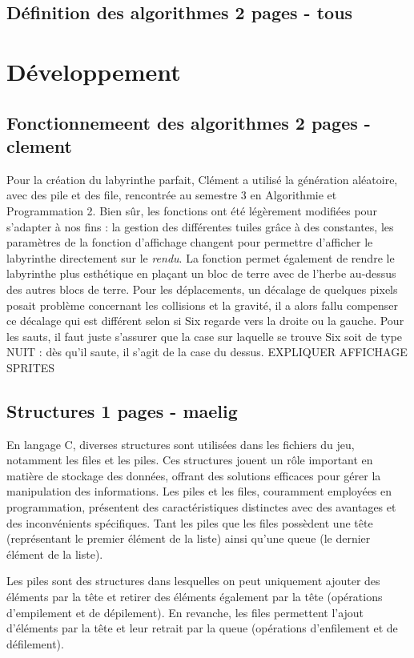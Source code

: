 \documentclass[10pt]{article}
\begin{document}
   \subsection{Définition des algorithmes 2 pages - tous}

\section{Développement}
   \subsection{Fonctionnemeent des algorithmes 2 pages - clement}
   Pour la création du \gls{labyrinthe} parfait, Clément a utilisé la génération aléatoire, avec des \gls{pile} et des \gls{file}, rencontrée au semestre 3 en Algorithmie et Programmation 2.
   Bien sûr, les fonctions ont été légèrement modifiées pour s'adapter à nos fins : la gestion des différentes tuiles grâce à des \gls{constantes}, les 
   paramètres de la fonction d'affichage changent pour permettre d'afficher le labyrinthe directement sur le \textit{\gls{rendu}}. La fonction permet également de rendre le labyrinthe plus esthétique
   en plaçant un bloc de terre avec de l'herbe au-dessus des autres blocs de terre. Pour les déplacements, un décalage de quelques pixels posait problème concernant les collisions et la gravité, il a alors fallu compenser ce décalage qui est différent selon si Six regarde vers
   la droite ou la gauche. Pour les sauts, il faut juste s'assurer que la case sur laquelle se trouve Six soit de type NUIT : dès qu'il saute, il s'agit de la case du dessus.
EXPLIQUER AFFICHAGE SPRITES
   \subsection{Structures 1 pages - maelig}

En langage C, diverses \gls{structures} sont utilisées dans les fichiers du jeu, notamment les files et les piles. Ces structures jouent un rôle important en matière de stockage des données, offrant des solutions efficaces pour gérer la manipulation des informations. Les piles et les files, couramment employées en programmation, présentent des caractéristiques distinctes avec des avantages et des inconvénients spécifiques. Tant les piles que les files possèdent une tête (représentant le premier élément de la liste) ainsi qu'une queue (le dernier élément de la liste).

Les piles sont des structures dans lesquelles on peut uniquement ajouter des éléments par la tête et retirer des éléments également par la tête (opérations d'empilement et de dépilement). En revanche, les files permettent l'ajout d'éléments par la tête et leur retrait par la queue (opérations d'enfilement et de défilement).
\end{document}
